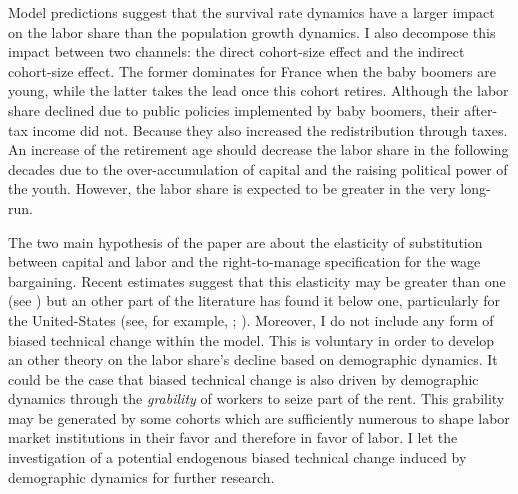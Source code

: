 
Model predictions suggest that the survival rate dynamics have a larger impact on the labor share than the population growth dynamics. I also decompose this impact between two channels: the direct cohort-size effect and the indirect cohort-size effect. The former dominates for France when the baby boomers are young, while the latter takes the lead once this cohort retires. Although the labor share declined due to public policies implemented by baby boomers, their after-tax income did not. Because they also increased the redistribution through taxes. An increase of the retirement age should decrease the labor share in the following decades due to the over-accumulation of capital and the raising political power of the youth. However, the labor share is expected to be greater in the very long-run.

The two main hypothesis of the paper are about the elasticity of substitution between capital and labor and the right-to-manage specification for the wage bargaining. Recent estimates suggest that this elasticity may be greater than one (see \cite{Karabarbounis2014}) but an other part of the literature has found it below one, particularly for the United-States (see, for example, \cite{Antras2004}; \cite{Chirinko2008}). Moreover, I do not include any form of biased technical change within the model. This is voluntary in order to develop an other theory on the labor share's decline based on demographic dynamics. It could be the case that biased technical change is also driven by demographic dynamics through the \textit{grability} of workers to seize part of the rent. This grability may be generated by some cohorts which are sufficiently numerous to shape labor market institutions in their favor and therefore in favor of labor. I let the investigation of a potential endogenous biased technical change induced by demographic dynamics for further research.






